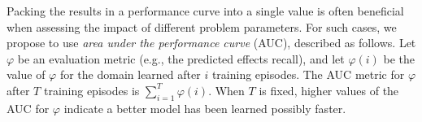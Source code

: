\documentclass[letterpaper]{article} %
\newif\ifaddcomments
\newcommand{\roni}[1]{\ifaddcomments{\textcolor{red}{[Roni: #1]}}\fi}
\begin{document}
Packing the results in a performance curve into a single value is often beneficial when assessing the impact of different problem parameters. For such cases, we propose to use \emph{area under the performance curve} (AUC), described as follows. 
Let $\varphi$ be an evaluation metric (e.g., the predicted effects recall), and let $\varphi(i)$ be the value of $\varphi$ for the domain learned after $i$ training episodes. 
The AUC metric for $\varphi$ after $T$ training episodes is $\sum_{i=1}^T \varphi(i)$. 
When $T$ is fixed, higher values of the AUC for $\varphi$ indicate a better model has been learned possibly faster. 




\end{document}
